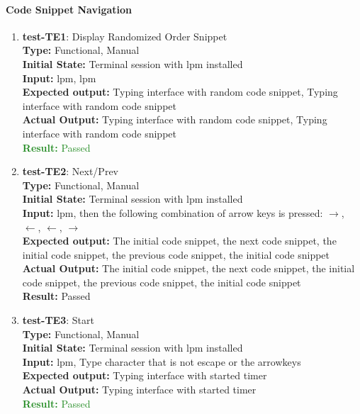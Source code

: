 \documentclass[12pt, titlepage]{article}
\begin{document}
\paragraph{Code Snippet Navigation}
\begin{enumerate}

\item{\textbf{test-TE1}: Display Randomized Order Snippet\\}
\textbf{Type:} Functional, Manual \\
\textbf{Initial State:} Terminal session with lpm installed \\
\textbf{Input:} lpm, lpm \\
\textbf{Expected output: }  Typing interface with random code snippet, Typing interface with random code snippet\\
\textbf{Actual Output:} Typing interface with random code snippet, Typing interface with random code snippet\\
\textcolor{ForestGreen}{\textbf{Result:} Passed}

\item{\textbf{test-TE2}: Next/Prev\\}
\textbf{Type:} Functional, Manual \\
\textbf{Initial State:} Terminal session with lpm installed \\
\textbf{Input:} lpm, then the following combination of arrow keys is pressed: $\rightarrow$, $\leftarrow$, $\leftarrow$, $\rightarrow$\\
\textbf{Expected output: }  The initial code snippet, the next code snippet, the initial code snippet, the previous code snippet, the initial code snippet\\
\textbf{Actual Output:} The initial code snippet, the next code snippet, the initial code snippet, the previous code snippet, the initial code snippet\\
\textbf{Result: } Passed

\item{\textbf{test-TE3}: Start \\}
\textbf{Type:} Functional, Manual \\
\textbf{Initial State:} Terminal session with lpm installed \\
\textbf{Input:} lpm, Type character that is not escape or the arrowkeys \\
\textbf{Expected output: }  Typing interface with started timer \\
\textbf{Actual Output:} Typing interface with started timer \\
\textcolor{ForestGreen}{\textbf{Result:} Passed}


\end{enumerate}
\end{document}
